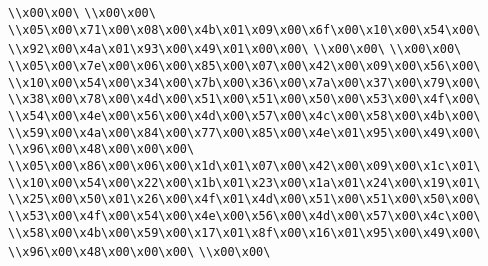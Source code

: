 \verb|\\x00\x00\|\newline
\verb|\\x00\x00\|\newline
\verb|\\x05\x00\x71\x00\x08\x00\x4b\x01\x09\x00\x6f\x00\x10\x00\x54\x00\|\newline
\verb|\\x92\x00\x4a\x01\x93\x00\x49\x01\x00\x00\|\newline
\verb|\\x00\x00\|\newline
\verb|\\x00\x00\|\newline
\verb|\\x05\x00\x7e\x00\x06\x00\x85\x00\x07\x00\x42\x00\x09\x00\x56\x00\|\newline
\verb|\\x10\x00\x54\x00\x34\x00\x7b\x00\x36\x00\x7a\x00\x37\x00\x79\x00\|\newline
\verb|\\x38\x00\x78\x00\x4d\x00\x51\x00\x51\x00\x50\x00\x53\x00\x4f\x00\|\newline
\verb|\\x54\x00\x4e\x00\x56\x00\x4d\x00\x57\x00\x4c\x00\x58\x00\x4b\x00\|\newline
\verb|\\x59\x00\x4a\x00\x84\x00\x77\x00\x85\x00\x4e\x01\x95\x00\x49\x00\|\newline
\verb|\\x96\x00\x48\x00\x00\x00\|\newline
\verb|\\x05\x00\x86\x00\x06\x00\x1d\x01\x07\x00\x42\x00\x09\x00\x1c\x01\|\newline
\verb|\\x10\x00\x54\x00\x22\x00\x1b\x01\x23\x00\x1a\x01\x24\x00\x19\x01\|\newline
\verb|\\x25\x00\x50\x01\x26\x00\x4f\x01\x4d\x00\x51\x00\x51\x00\x50\x00\|\newline
\verb|\\x53\x00\x4f\x00\x54\x00\x4e\x00\x56\x00\x4d\x00\x57\x00\x4c\x00\|\newline
\verb|\\x58\x00\x4b\x00\x59\x00\x17\x01\x8f\x00\x16\x01\x95\x00\x49\x00\|\newline
\verb|\\x96\x00\x48\x00\x00\x00\|\newline
\verb|\\x00\x00\|\newline
